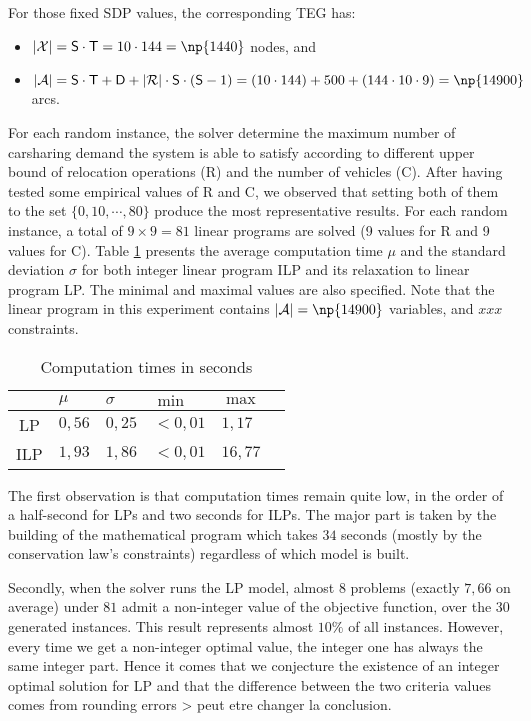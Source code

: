 \begin{bibunit}[ieeetr]
\bigskip
For those fixed SDP values, the corresponding TEG has:
\begin{itemize}
\item $|\tegNodeSet| = \nbStations \cdot \nbTimeSteps = 10 \cdot 144 = \np{1440}$ nodes, and
\item $|\tegArcSet| = \nbStations \cdot \nbTimeSteps + \nbDemands + |\relocTimeStepSet| \cdot \nbStations \cdot (\nbStations - 1) = (10 \cdot 144) + 500 + (144 \cdot 10 \cdot 9) = \np{14900}$ arcs.
\end{itemize}

For each random instance, the solver determine the maximum number of carsharing demand the system is able to satisfy according to different upper bound of relocation operations (R) and the number of vehicles (C).
After having tested some empirical values of R and C, we observed that setting both of them to the set $\{0, 10, \cdots, 80\}$ produce the most representative results.
For each random instance, a total of $9 \times 9 = 81$ linear programs are solved (9 values for R and 9 values for C).
Table \ref{table_computationTimes} presents the average computation time $\mu$ and the standard deviation $\sigma$ for both integer linear program ILP and its relaxation to linear program LP.
The minimal and maximal values are also specified.
Note that the linear program in this experiment contains $|\tegArcSet| = \np{14900}$ variables, and  $xxx$ constraints.

\begin{table}[h]
\renewcommand{\arraystretch}{2.3}
\caption{Computation times in seconds}
\label{table_computationTimes}
\centering
\begin{tabularx}{.8\linewidth}{|c|*{5}{>{\centering \arraybackslash}X|}}
\cline{2-5}
\multicolumn{1}{c|}{} & $\mu$ & $\sigma$ & $\min$ & $\max$ \\
\hline
LP  & $0,56$ & $0,25$ &	$<0,01$ &  $1,17$ \\
ILP & $1,93$ & $1,86$ &	$<0,01$ & $16,77$ \\
\hline
\end{tabularx}
\end{table}

The first observation is that computation times remain quite low, in the order of a half-second for LPs and two seconds for ILPs.
The major part is taken by the building of the mathematical program which takes $34$ seconds (mostly  by the conservation law's constraints) regardless of which model is built.

Secondly, when the solver runs the LP model, almost $8$ problems (exactly $7,66$ on average) under $81$ admit a non-integer value of the objective function, over the $30$ generated instances.
This result represents almost $10\%$ of all instances.
However, every time we get a non-integer optimal value, the integer one has always the same integer part.
Hence it comes that we conjecture the existence of an integer optimal solution for LP and that the difference between the two criteria values comes from rounding errors > peut etre changer la conclusion.


\end{bibunit}
